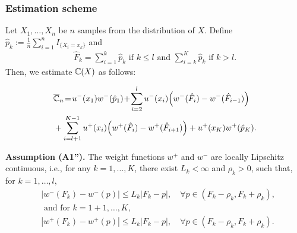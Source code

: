 \subsubsection*{Estimation scheme} 
Let $X_1,\ldots,X_n$ be $n$ samples from the distribution of $X$. 
Define $\hat p_k:= \frac{1}{n} \sum_{i=1}^n I_{\{X_i =x_k\}}$ and 
\begin{align}
\label{eq:Fkhat}
 \hat F_k = 
   \sum_{i=1}^k \hat p_k  \text{ if   } k \leq l \text{ and }
   \sum_{i=k}^K \hat p_k  \text{ if  }  k > l.
\end{align}
Then, we estimate $\mathbb{C}(X)$ as follows:
\begin{small}
\begin{align*}
&\overline {\mathbb{C}}_n \!=\! 
u^-(x_1) w^-(\hat p_1) \!+\!\sum_{i=2}^l u^-(x_i) \Big(w^-(\hat F_i) - w^-( \hat F_{i-1})\Big) 
\nonumber\\
&
+ \sum_{i=l+1}^{K-1} u^+(x_i) \Big(w^+(\hat F_i) - w^+(\hat F_{i+1}) \Big) + u^+(x_K) w^+(\hat p_K). 
\end{align*}
\end{small}

\noindent\textbf{Assumption (A1'').}  The weight functions $w^+$ and $w^-$ are locally Lipschitz continuous, i.e., for any $k=1,\ldots,K$, there exist  $L_k< \infty$ and $\rho_k>0$, such that, for $k=1,\ldots,l$,
\begin{align*}
&| w^-(F_k) - w^-(p) | \leq L_k |F_k-p|, \quad\forall p \in (F_k-\rho_k,F_k+\rho_k),\\
&\text{ and for } k=1+1,\ldots,K,\\
&| w^+(F_k) - w^+(p) | \leq L_k |F_k-p|, \quad \forall p \in (F_k-\rho_k,F_k+\rho_k). 
\end{align*}



